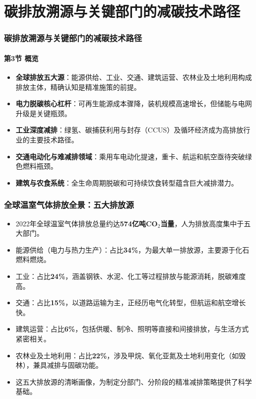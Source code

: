 \documentclass[11pt]{beamer}
\begin{document}
\section{碳排放溯源与关键部门的减碳技术路径}

\begin{frame}
\frametitle{碳排放溯源与关键部门的减碳技术路径}
\framesubtitle{第3节 概览}
\small
\begin{itemize}
  \item \textbf{全球排放五大源}：能源供给、工业、交通、建筑运营、农林业及土地利用构成排放主体，精确认知是精准施策的前提。
  \item \textbf{电力脱碳核心杠杆}：可再生能源成本骤降，装机规模高速增长，但储能与电网升级是关键瓶颈。
  \item \textbf{工业深度减排}：绿氢、碳捕获利用与封存（CCUS）及循环经济成为高排放行业的主要技术路径。
  \item \textbf{交通电动化与难减排领域}：乘用车电动化提速，重卡、航运和航空亟待突破绿色燃料瓶颈。
  \item \textbf{建筑与农食系统}：全生命周期脱碳和可持续饮食转型蕴含巨大减排潜力。
\end{itemize}
\end{frame}

\begin{frame}
\frametitle{全球温室气体排放全景：五大排放源}
\small
\begin{itemize}
  \item 2022年全球温室气体排放总量约达\textbf{574亿吨CO$_2$当量}，人为排放高度集中于五大部门。
  \item \alert{能源供给（电力与热力生产）}：占比\textbf{34\%}，为最大单一排放源，主要源于化石燃料燃烧。
  \item \alert{工业}：占比\textbf{24\%}，涵盖钢铁、水泥、化工等过程排放与能源消耗，脱碳难度高。
  \item \alert{交通}：占比\textbf{15\%}，以道路运输为主，正经历电气化转型，但航运和航空增长快。
  \item \alert{建筑运营}：占比\textbf{6\%}，包括供暖、制冷、照明等直接和间接排放，与生活方式紧密相关。
  \item \alert{农林业及土地利用}：占比\textbf{22\%}，涉及甲烷、氧化亚氮及土地利用变化（如毁林），兼具减排与固碳功能。
  \item 这五大排放源的清晰画像，为制定分部门、分阶段的精准减排策略提供了科学基础。
\end{itemize}
\end{frame}
\end{document}
